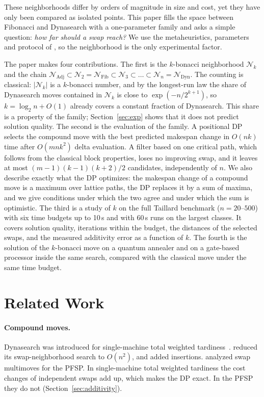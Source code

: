 \documentclass[letterpaper]{article} %
\theoremstyle{definition}
\newcommand{\N}{\mathcal{N}}
\begin{document}
These neighborhoods differ by orders of magnitude in size and cost, yet
they have only been compared as isolated points. This paper fills the
space between Fibonacci and Dynasearch with a one-parameter family and
asks a simple question: \emph{how far should a swap reach?} We use the metaheuristics, parameters and protocol
of \citet{wojewodzki2026icaisc,wojewodzki2026soco,wojewodzki2026windowed},
so the neighborhood is the only experimental factor.

The paper makes four contributions. The first is the $k$-bonacci
neighborhood $\N_k$ and the chain
$\N_{\mathrm{Adj}}\subset\N_2=\N_{\mathrm{Fib}}\subset\N_3\subset
\dots\subset\N_n=\N_{\mathrm{Dyn}}$. The counting is classical: $|\N_k|$ is a
$k$-bonacci number, and by the longest-run law the share of Dynasearch
moves contained in $\N_k$ is close to $\exp(-n/2^{k+1})$, so
$k=\log_2 n+O(1)$
already covers a constant fraction of Dynasearch. This share is a
property of the family; Section~\ref{sec:exp} shows that it does not
predict solution quality. The second is the
evaluation of the family. A positional DP selects the compound move with
the best predicted makespan change in $O(nk)$ time after $O(mnk^2)$ delta
evaluation. A filter based on one critical path, which follows from the
classical block properties, loses no improving swap, and it leaves at
most $(m-1)(k-1)(k+2)/2$ candidates, independently of $n$. We also
describe exactly what the DP optimizes: the makespan change of a compound
move is a maximum over lattice paths, the DP replaces it by a sum of
maxima, and we give conditions under which the two agree and under which
the sum is optimistic. The third is a study of $k$ on the
full Taillard benchmark ($n=20$--$500$) with six time budgets up to
10\,s and with 60\,s runs on the largest classes. It covers
solution quality, iterations within the budget, the distances of the
selected swaps, and the measured additivity error as a function of $k$.
The fourth is the solution of the $k$-bonacci move on a quantum annealer and on a
gate-based processor inside the same search, compared with the
classical move under the same time budget.

\section{Related Work}

\paragraph{Compound moves.} Dynasearch was introduced for single-machine
total weighted tardiness~\cite{congram2002}. \citet{ergun2006} reduced its swap-neighborhood search to $O(n^2)$,
and \citet{grosso2004} added insertions. \citet{bozejko2007} analyzed swap multimoves for the PFSP. In
single-machine total weighted tardiness the cost changes of independent
swaps add up, which makes the DP exact. In the PFSP they do not
(Section~\ref{sec:additivity}).
\end{document}
